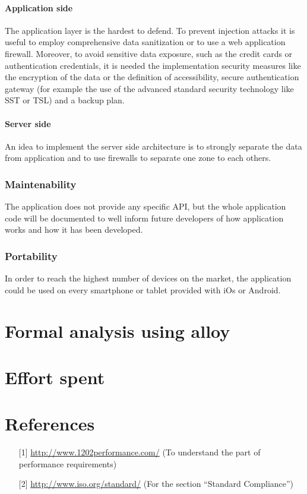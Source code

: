 \documentclass[12pt,titlepage]{article}
\begin{document}
\paragraph{Application side}
The application layer is the hardest to defend. To prevent injection attacks it is useful to employ comprehensive data sanitization or to use a web application firewall. Moreover, to avoid sensitive data exposure, such as the credit cards or authentication credentials, it is needed the implementation security measures like the encryption of the data or the definition of accessibility, secure authentication gateway (for example the use of the advanced standard security technology like SST or TSL) and a backup plan.

\paragraph{Server side}
An idea to implement the server side architecture is to strongly separate the data from application and to use firewalls to separate one zone to each others. 


\subsubsection{Maintenability}\label{sec:mod1}
The application does not provide any specific API, but the whole application code will be documented to well inform future developers of how application works and how it has been developed. 

\subsubsection{Portability}\label{sec:mod1}
In order to reach the highest number of devices on the market, the application could be used on every smartphone or tablet provided with iOs or Android. 
\pagebreak
\section{Formal analysis using alloy}\label{sec:crit}
\pagebreak
\section{Effort spent}\label{sec:crit}
\pagebreak

\section{References}\label{sec:crit}
\begin{itemize}
\item [{[1]}] \url{http://www.1202performance.com/} (To understand the part of performance requirements)
\item [{[2]}] \url{http://www.iso.org/standard/} (For the section ``Standard Compliance'')
\end{itemize}
\end{document}
